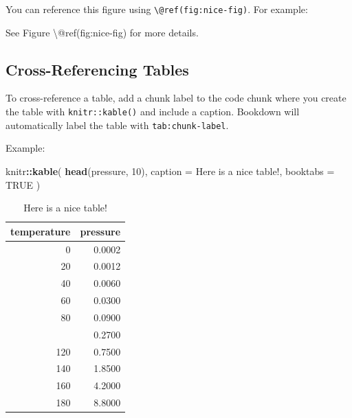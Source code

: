 \documentclass[
]{book}
\newenvironment{Shaded}{\begin{snugshade}}{\end{snugshade}}
\newcommand{\AttributeTok}[1]{\textcolor[rgb]{0.13,0.29,0.53}{#1}}
\newcommand{\ConstantTok}[1]{\textcolor[rgb]{0.56,0.35,0.01}{#1}}
\newcommand{\DecValTok}[1]{\textcolor[rgb]{0.00,0.00,0.81}{#1}}
\newcommand{\FunctionTok}[1]{\textcolor[rgb]{0.13,0.29,0.53}{\textbf{#1}}}
\newcommand{\NormalTok}[1]{#1}
\newcommand{\SpecialCharTok}[1]{\textcolor[rgb]{0.81,0.36,0.00}{\textbf{#1}}}
\newcommand{\StringTok}[1]{\textcolor[rgb]{0.31,0.60,0.02}{#1}}
\theoremstyle{definition}
\theoremstyle{definition}
\theoremstyle{definition}
\theoremstyle{definition}
\theoremstyle{remark}
\begin{document}
You can reference this figure using \texttt{\textbackslash{}@ref(fig:nice-fig)}. For example:

\begin{Shaded}
\begin{Highlighting}[]
\NormalTok{See Figure \textbackslash{}@ref(fig:nice{-}fig) for more details.}
\end{Highlighting}
\end{Shaded}

\subsection{Cross-Referencing Tables}\label{cross-referencing-tables-1}

To cross-reference a table, add a chunk label to the code chunk where you create the table with \texttt{knitr::kable()} and include a caption. Bookdown will automatically label the table with \texttt{tab:chunk-label}.

Example:

\begin{Shaded}
\begin{Highlighting}[]
\NormalTok{knitr}\SpecialCharTok{::}\FunctionTok{kable}\NormalTok{(}
  \FunctionTok{head}\NormalTok{(pressure, }\DecValTok{10}\NormalTok{), }\AttributeTok{caption =} \StringTok{\textquotesingle{}Here is a nice table!\textquotesingle{}}\NormalTok{,}
  \AttributeTok{booktabs =} \ConstantTok{TRUE}
\NormalTok{)}
\end{Highlighting}
\end{Shaded}

\begin{table}

\caption{\label{tab:nice-tab}Here is a nice table!}
\centering
\begin{tabular}[t]{rr}
\toprule
temperature & pressure\\
\midrule
0 & 0.0002\\
20 & 0.0012\\
40 & 0.0060\\
60 & 0.0300\\
80 & 0.0900\\
\addlinespace
100 & 0.2700\\
120 & 0.7500\\
140 & 1.8500\\
160 & 4.2000\\
180 & 8.8000\\
\bottomrule
\end{tabular}
\end{table}
\end{document}
